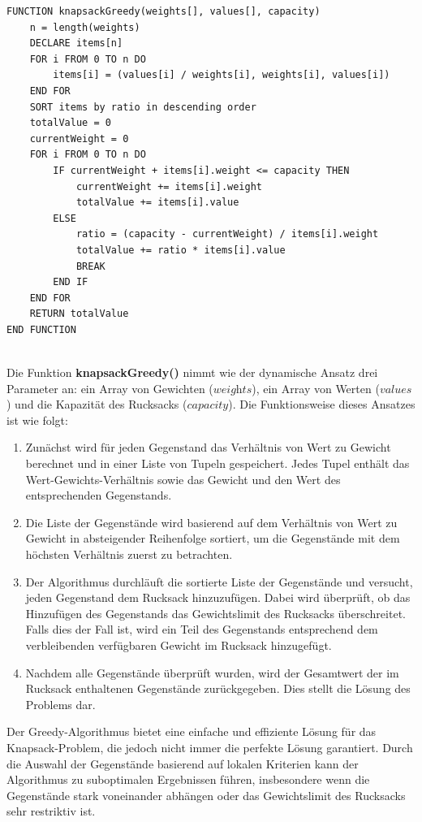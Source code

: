\begin{lstlisting}[style=csharp, caption={Greedy Algorithmus}]
FUNCTION knapsackGreedy(weights[], values[], capacity)
    n = length(weights)
    DECLARE items[n]
    FOR i FROM 0 TO n DO
        items[i] = (values[i] / weights[i], weights[i], values[i])
    END FOR
    SORT items by ratio in descending order
    totalValue = 0
    currentWeight = 0
    FOR i FROM 0 TO n DO
        IF currentWeight + items[i].weight <= capacity THEN
            currentWeight += items[i].weight
            totalValue += items[i].value
        ELSE
            ratio = (capacity - currentWeight) / items[i].weight
            totalValue += ratio * items[i].value
            BREAK
        END IF
    END FOR
    RETURN totalValue
END FUNCTION
\end{lstlisting}\\
Die Funktion \textbf{knapsackGreedy()} nimmt wie der dynamische Ansatz drei Parameter an: ein Array von Gewichten (\( \textit{weights} \)),
ein Array von Werten (\( \textit{values} \)) und die Kapazität des Rucksacks (\( \textit{capacity} \)). Die Funktionsweise
dieses Ansatzes ist wie folgt:

\begin{enumerate}
    \item Zunächst wird für jeden Gegenstand das Verhältnis von Wert zu Gewicht berechnet und in einer Liste von Tupeln
    gespeichert. Jedes Tupel enthält das Wert-Gewichts-Verhältnis sowie das Gewicht und den Wert des entsprechenden Gegenstands.
    \item Die Liste der Gegenstände wird basierend auf dem Verhältnis von Wert zu Gewicht in absteigender Reihenfolge
    sortiert, um die Gegenstände mit dem höchsten Verhältnis zuerst zu betrachten.
    \item Der Algorithmus durchläuft die sortierte Liste der Gegenstände und versucht, jeden Gegenstand dem Rucksack
    hinzuzufügen. Dabei wird überprüft, ob das Hinzufügen des Gegenstands das Gewichtslimit des Rucksacks überschreitet.
    Falls dies der Fall ist, wird ein Teil des Gegenstands entsprechend dem verbleibenden verfügbaren Gewicht im Rucksack hinzugefügt.
    \item Nachdem alle Gegenstände überprüft wurden, wird der Gesamtwert der im Rucksack enthaltenen Gegenstände zurückgegeben.
    Dies stellt die Lösung des Problems dar.
\end{enumerate}

Der Greedy-Algorithmus bietet eine einfache und effiziente Lösung für das Knapsack-Problem, die jedoch nicht immer die
perfekte Lösung garantiert. Durch die Auswahl der Gegenstände basierend auf lokalen Kriterien kann der Algorithmus zu
suboptimalen Ergebnissen führen, insbesondere wenn die Gegenstände stark voneinander abhängen oder das Gewichtslimit des
Rucksacks sehr restriktiv ist.

